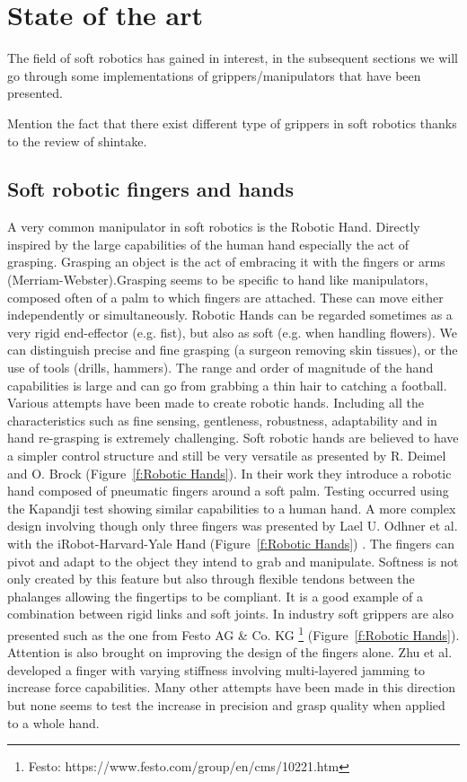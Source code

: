 \section{State of the art}
\label{s:Stateoftheart}

The field of soft robotics has gained in interest, in the subsequent sections we will go through some implementations of grippers/manipulators that have been presented.


Mention the fact that there exist different type of grippers in soft robotics thanks to the review of shintake.

\subsection{Soft robotic fingers and hands}
\label{s:SoftRoboticHands}
A very common manipulator in soft robotics is the Robotic Hand. Directly inspired by the large capabilities of the human hand especially the act of grasping. Grasping an object is the act of embracing it with the fingers or arms (Merriam-Webster).Grasping seems to be specific to hand like manipulators, composed often of a palm to which fingers are attached. These can move either independently or simultaneously. Robotic Hands can be regarded sometimes as a very rigid end-effector (e.g. fist), but also as soft (e.g. when handling flowers). We can distinguish precise and fine grasping (a surgeon removing skin tissues), or the use of tools (drills, hammers). The range and order of magnitude of the hand capabilities is large and can go from grabbing a thin hair to catching a football. Various attempts have been made to create robotic hands. Including all the characteristics such as fine sensing, gentleness, robustness, adaptability and in hand re-grasping is extremely challenging. Soft robotic hands are believed to have a simpler control structure and still be very versatile as presented by R. Deimel and O. Brock \cite{deimel2016novel} (Figure~\ref{f:Robotic Hands}). In their work they introduce a robotic hand composed of pneumatic fingers around a soft palm. Testing occurred using the Kapandji test \cite{kapandji1986clinical} showing similar capabilities to a human hand. A more complex design involving though only three fingers was presented by Lael U. Odhner et al. with the iRobot-Harvard-Yale Hand (Figure~\ref{f:Robotic Hands}) \cite{odhner2014compliant}. The fingers can pivot and adapt to the object they intend to grab and manipulate. Softness is not only created by this feature but also through flexible tendons between the phalanges allowing the fingertips to be compliant. It is a good example of a combination between rigid links and soft joints. In industry soft grippers are also presented such as the one from Festo AG \& Co. KG \footnote{Festo: https://www.festo.com/group/en/cms/10221.htm} (Figure~\ref{f:Robotic Hands}). Attention is also brought on improving the design of the fingers alone. Zhu et al. \cite{Zhu} developed a finger with varying stiffness involving multi-layered jamming to increase force capabilities. Many other attempts have been made in this direction \cite{kim2013novel, shan2015rigidity, firouzeh2015soft} but none seems to test the increase in precision and grasp quality when applied to a whole hand.   

